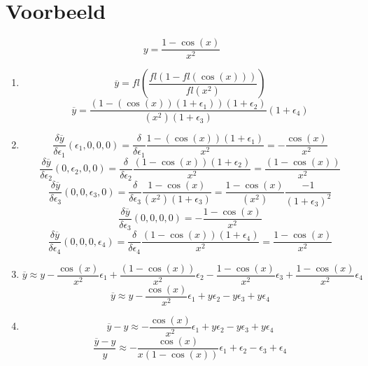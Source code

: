 \documentclass[10pt,a4paper]{article}
\begin{document}
\section{Voorbeeld}
\[
y = \frac{1-\cos(x)}{x^2}
\]
\begin{enumerate}
\item
\[
\overline{y} = fl\left(\frac{fl(1-fl(\cos(x)))}{fl(x^2)}\right)
\]
\[
\overline{y} = \frac{(1-(\cos(x))(1+\epsilon_1))(1+\epsilon_2)}{(x^2)(1+\epsilon_3)}(1+\epsilon_4)
\]

\item
\[
\frac{\delta \overline{y}}{\delta \epsilon_1}(\epsilon_1,0,0,0)
= \frac{\delta}{\delta \epsilon_1}\frac{1-(\cos(x))(1+\epsilon_1)}{x^2} 
= -\frac{\cos(x)}{x^2}
\]
\[
\frac{\delta \overline{y}}{\delta \epsilon_2}(0,\epsilon_2,0,0)
= \frac{\delta}{\delta \epsilon_2}\frac{(1-\cos(x))(1+\epsilon_2)}{x^2}
= \frac{(1-\cos(x))}{x^2}
\]
\[
\frac{\delta \overline{y}}{\delta \epsilon_3}(0,0,\epsilon_3,0)
= \frac{\delta}{\delta \epsilon_3}\frac{1-\cos(x)}{(x^2)(1+\epsilon_3)} = \frac{1-\cos(x)}{(x^2)}\frac{-1}{(1+\epsilon_3)^2}
\]
\[
\frac{\delta \overline{y}}{\delta \epsilon_3}(0,0,0,0) = -\frac{1-\cos(x)}{x^2}
\]
\[
\frac{\delta \overline{y}}{\delta \epsilon_4}(0,0,0,\epsilon_4)
= \frac{\delta}{\delta \epsilon_4}\frac{(1-\cos(x))(1+\epsilon_4)}{x^2}
= \frac{1 - \cos(x)}{x^2}
\]

\item
\[
\overline{y} \approx y -\frac{\cos(x)}{x^2}\epsilon_1
+ \frac{(1-\cos(x))}{x^2}\epsilon_2
- \frac{1-\cos(x)}{x^2}\epsilon_3
+ \frac{1 - \cos(x)}{x^2}\epsilon_4
\]
\[
\overline{y} \approx y - \frac{\cos(x)}{x^2}\epsilon_1 + y\epsilon_2 - y\epsilon_3 + y\epsilon_4
\]

\item
\[
\overline{y}-y \approx - \frac{\cos(x)}{x^2}\epsilon_1 + y\epsilon_2 - y\epsilon_3 + y\epsilon_4
\]
\[
\frac{\overline{y}-y}{y} \approx - \frac{\cos(x)}{x(1-\cos(x))}\epsilon_1 + \epsilon_2 - \epsilon_3 + \epsilon_4
\]

\end{enumerate}
\end{document}
